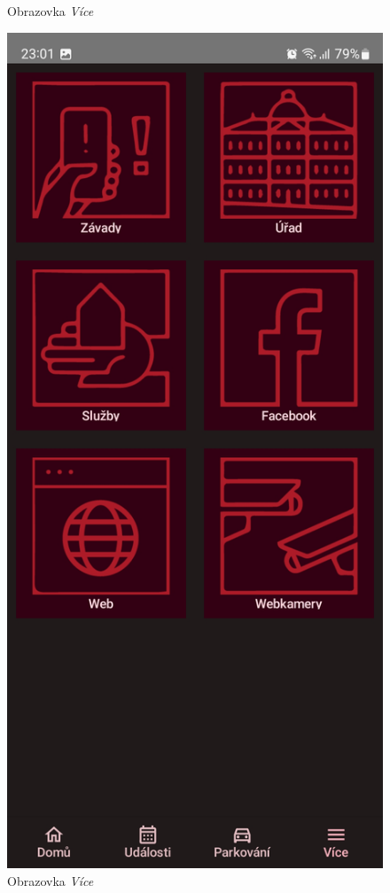 \begin{figure}[H]
  \caption{Obrazovka \textit{Více}}
\endminipage\hfill
{}
  \includegraphics[width=\linewidth]{screens/4a_B.jpg}
  \caption{Obrazovka \textit{Více}}
\endminipage\hfill
\end{figure}

